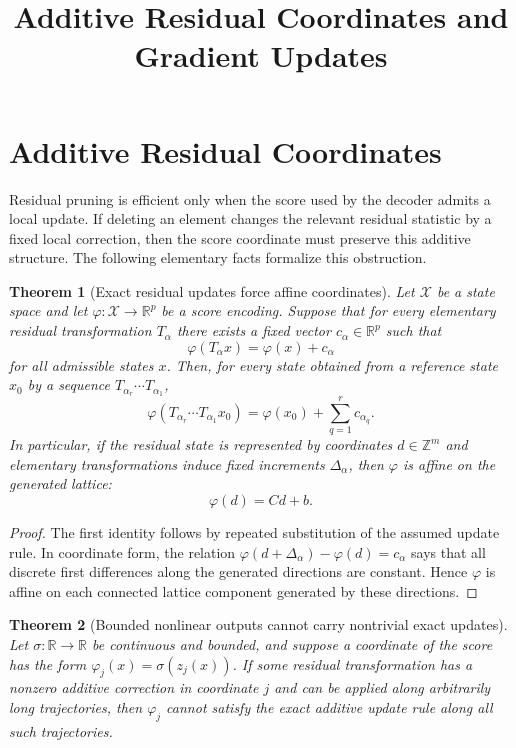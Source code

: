 \documentclass[11pt]{article}
\title{\large Additive Residual Coordinates and Gradient Updates}
\author{}
\date{}
\theoremstyle{plain}
\newtheorem{theorem}{Theorem}[section]
\theoremstyle{remark}
\newcommand{\R}{\mathbb{R}}
\begin{document}
\maketitle

\section{Additive Residual Coordinates}

Residual pruning is efficient only when the score used by the decoder admits a
local update.  If deleting an element changes the relevant residual statistic by
a fixed local correction, then the score coordinate must preserve this additive
structure.  The following elementary facts formalize this obstruction.

\begin{theorem}[Exact residual updates force affine coordinates]
  \label{thm:affine}
  Let $\mathcal{X}$ be a state space and let
  $\varphi:\mathcal{X}\to\R^p$ be a score encoding.  Suppose that for every
  elementary residual transformation $T_\alpha$ there exists a fixed vector
  $c_\alpha\in\R^p$ such that
  \[
    \varphi(T_\alpha x)=\varphi(x)+c_\alpha
  \]
  for all admissible states $x$.  Then, for every state obtained from a
  reference state $x_0$ by a sequence $T_{\alpha_r}\cdots T_{\alpha_1}$,
  \[
    \varphi(T_{\alpha_r}\cdots T_{\alpha_1}x_0)
    =
    \varphi(x_0)+\sum_{q=1}^r c_{\alpha_q}.
  \]
  In particular, if the residual state is represented by coordinates
  $d\in\mathbb{Z}^m$ and elementary transformations induce fixed increments
  $\Delta_\alpha$, then $\varphi$ is affine on the generated lattice:
  \[
    \varphi(d)=Cd+b.
  \]
\end{theorem}

\begin{proof}
  The first identity follows by repeated substitution of the assumed update
  rule.  In coordinate form, the relation
  $\varphi(d+\Delta_\alpha)-\varphi(d)=c_\alpha$ says that all discrete first
  differences along the generated directions are constant.  Hence $\varphi$ is
  affine on each connected lattice component generated by these directions.
\end{proof}

\begin{theorem}[Bounded nonlinear outputs cannot carry nontrivial exact updates]
  \label{thm:nonlinear}
  Let $\sigma:\R\to\R$ be continuous and bounded, and suppose a coordinate of
  the score has the form $\varphi_j(x)=\sigma(z_j(x))$.  If some residual
  transformation has a nonzero additive correction in coordinate $j$ and can be
  applied along arbitrarily long trajectories, then $\varphi_j$ cannot satisfy
  the exact additive update rule along all such trajectories.
\end{theorem}
\end{document}
